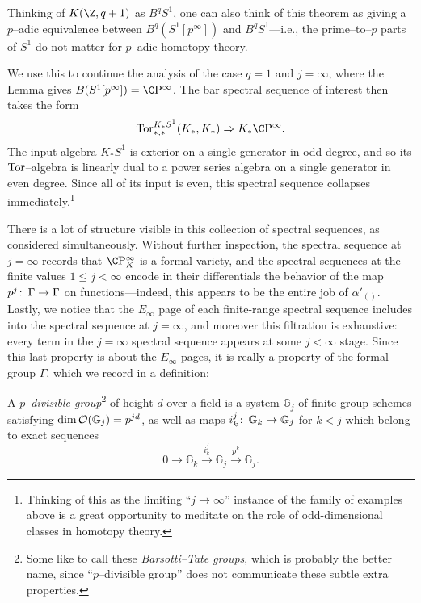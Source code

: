 \begin{remark}
Thinking of \(K(\Z, q+1)\) as \(B^q S^1\), one can also think of this theorem as giving a \(p\)--adic equivalence between \(B^q(S^1[p^\infty])\) and \(B^q S^1\)---i.e., the prime--to--\(p\) parts of \(S^1\) do not matter for \(p\)--adic homotopy theory.
\end{remark}

We use this to continue the analysis of the case \(q = 1\) and \(j = \infty\), where the Lemma gives \(B(S^1[p^\infty]) = \CP^\infty\).  The bar spectral sequence of interest then takes the form \[\Tor^{K_* S^1}_{*, *}(K_*, K_*) \Rightarrow K_* \CP^\infty.\]  The input algebra \(K_* S^1\) is exterior on a single generator in odd degree, and so its \(\operatorname{Tor}\)--algebra is linearly dual to a power series algebra on a single generator in even degree.  Since all of its input is even, this spectral sequence collapses immediately.\footnote{Thinking of this as the limiting ``\(j \to \infty\)'' instance of the family of examples above is a great opportunity to meditate on the role of odd-dimensional classes in homotopy theory.}

There is a lot of structure visible in this collection of spectral sequences, as considered simultaneously.  Without further inspection, the spectral sequence at \(j = \infty\) records that \(\CP^\infty_K\) is a formal variety, and the spectral sequences at the finite values \(1 \le j < \infty\) encode in their differentials the behavior of the map \(p^j\colon\thinspace \Gamma \to \Gamma\) on functions---indeed, this appears to be the entire job of \(\alpha'_{()}\).  Lastly, we notice that the \(E_\infty\) page of each finite-range spectral sequence includes into the spectral sequence at \(j = \infty\), and moreover this filtration is exhaustive: every term in the \(j = \infty\) spectral sequence appears at some \(j < \infty\) stage.  Since this last property is about the \(E_\infty\) pages, it is really a property of the formal group \(\Gamma\), which we record in a definition:

\begin{definition}\label{DefnPDivGp}
A \textit{\(p\)--divisible group}\footnote{Some like to call these \textit{Barsotti--Tate groups}, which is probably the better name, since ``\(p\)--divisible group'' does not communicate these subtle extra properties.} of height \(d\) over a field is a system \(\mathbb G_j\) of finite group schemes satisfying \(\operatorname{dim} \mathcal{O}(\mathbb G_j) = p^{jd}\), as well as maps \(i_k^j\colon\thinspace \mathbb G_k \to \mathbb G_j\) for \(k < j\) which belong to exact sequences \[0 \to \mathbb G_k \xrightarrow{i_k^j} \mathbb G_j \xrightarrow{p^k} \mathbb G_j.\]
\end{definition}

